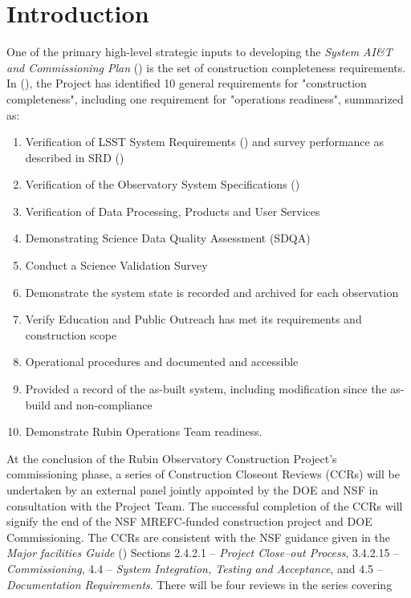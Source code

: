 
\section {Introduction}

One of the primary high-level strategic inputs to developing the {\it System AI\&T and Commissioning Plan} () is the set of construction completeness requirements.
In (), the Project has identified 10 general requirements for "construction completeness", including one requirement for "operations readiness", summarized as:

\begin{enumerate}
        \item Verification of LSST System Requirements () and survey performance as described in SRD ()
        \item Verification of the Observatory System Specifications ()
        \item Verification of Data Processing, Products and User Services
        \item Demonstrating Science Data Quality Assessment (SDQA)
        \item Conduct a Science Validation Survey
        \item Demonstrate the system state is recorded and archived for each observation
        \item Verify Education and Public Outreach has met its requirements and construction scope
        \item Operational procedures and documented and accessible
        \item Provided a record of the as-built system, including modification since the as-build and non-compliance
        \item Demonstrate Rubin Operations Team readiness.
\end{enumerate}

At the conclusion of the Rubin Observatory Construction Project's commissioning phase, a series of Construction Closeout Reviews (CCRs) will be undertaken by an external panel jointly appointed by the DOE and NSF in consultation with the Project Team.
The successful completion of the CCRs will signify the end of the NSF MREFC-funded construction project and DOE Commissioning.
The CCRs are consistent with the NSF guidance given in the {\it Major facilities Guide} () Sections 2.4.2.1 -- {\it Project Close--out Process}, 3.4.2.15 -- {\it Commissioning}, 4.4 -- {\it System Integration, Testing and Acceptance}, and 4.5 -- {\it Documentation Requirements}.
There will be four reviews in the series covering

